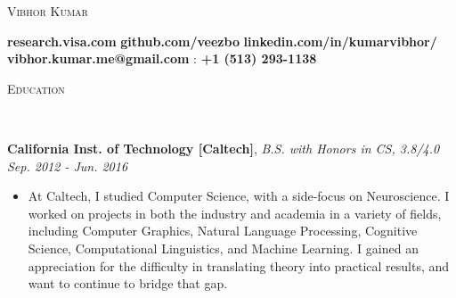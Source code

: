 \documentclass[9pt]{article}
\newenvironment{changemargin}[2]{%
  \begin{list}{}{%
    \setlength{\topsep}{0pt}%
    \setlength{\leftmargin}{#1}%
    \setlength{\rightmargin}{#2}%
    \setlength{\listparindent}{\parindent}%
    \setlength{\itemindent}{\parindent}%
    \setlength{\parsep}{\parskip}%
  }%
  \item[]}{\end{list}
}
\newcommand{\lineover}{
	\begin{changemargin}{-0.05in}{-0.05in}
		\vspace*{-8pt}
		\hrulefill \\
		\vspace*{-2pt}
	\end{changemargin}
}
\newcommand{\header}[1]{
	\begin{changemargin}{-0.5in}{-0.5in}
		\scshape{#1}\\
  	\lineover
	\end{changemargin}
}
\newenvironment{body} {
	\vspace*{-16pt}
	\begin{changemargin}{-0.25in}{-0.5in}
  }	
	{\end{changemargin}
}
\begin{document}
\begin{center} 
	{\Large \scshape Vibhor Kumar} 
\end{center}
	\vspace*{-2pt}
\faCcVisa \hspace{0.25mm} \textbf{research.visa.com} \hspace{7.25mm} \faGithub \hspace{0.25mm} \textbf{github.com/veezbo} \hspace{7.25mm} \faLinkedinSquare \hspace{0.25mm} \textbf{linkedin.com/in/kumarvibhor/} \\
\vspace*{3pt}  \hspace{12.25mm} \faEnvelope \hspace{0.1mm} \textbf{vibhor.kumar.me@gmail.com} \hspace{8.25mm} \faMobile : \textbf{+1 (513) 293-1138}\\
\vspace{1pt}
\smallskip
\header{Education}
\begin{body}
	\vspace{16pt}
	\textbf{California Inst. of Technology [Caltech]}{}, \emph{B.S. with Honors in CS, 3.8/4.0} \hfill \emph{Sep. 2012 - Jun. 2016}{} \\
	\vspace{-3pt}
	\begin{itemize} \itemsep -0pt
    \item At Caltech, I studied Computer Science, with a side-focus on Neuroscience. I worked on projects in both the industry and academia in a variety of fields, including Computer Graphics, Natural Language Processing, Cognitive Science, Computational Linguistics, and Machine Learning. I gained an appreciation for the difficulty in translating theory into practical results, and want to continue to bridge that gap.
	\end{itemize}
\end{body}

\smallskip
\vspace*{-3pt}
\end{document}
